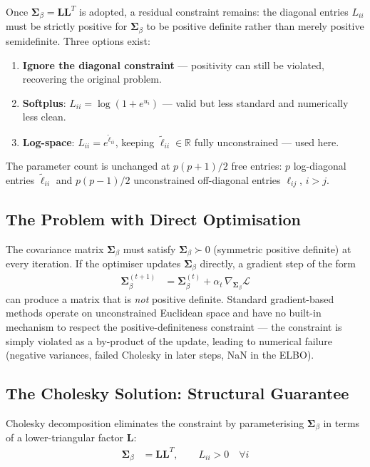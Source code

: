 \documentclass[11pt,a4paper]{article}
\newcommand{\R}{\mathbb{R}}
\begin{document}
Once $\bm{\Sigma}_\beta = \bm{L}\bm{L}^T$ is adopted, a residual constraint remains: the diagonal entries $L_{ii}$ must be strictly positive for $\bm{\Sigma}_\beta$ to be positive definite rather than merely positive semidefinite. Three options exist:
\begin{enumerate}
  \item \textbf{Ignore the diagonal constraint} --- positivity can still be violated, recovering the original problem.
  \item \textbf{Softplus}: $L_{ii} = \log(1 + e^{u_i})$ --- valid but less standard and numerically less clean.
  \item \textbf{Log-space}: $L_{ii} = e^{\tilde{\ell}_{ii}}$, keeping $\tilde{\ell}_{ii} \in \R$ fully unconstrained --- used here.
\end{enumerate}
The parameter count is unchanged at $p(p+1)/2$ free entries: $p$ log-diagonal entries $\tilde{\ell}_{ii}$ and $p(p-1)/2$ unconstrained off-diagonal entries $\ell_{ij}$, $i > j$.

\subsection*{The Problem with Direct Optimisation}

The covariance matrix $\bm{\Sigma}_\beta$ must satisfy $\bm{\Sigma}_\beta \succ 0$ (symmetric positive definite) at every iteration. If the optimiser updates $\bm{\Sigma}_\beta$ directly, a gradient step of the form
\begin{align}
  \bm{\Sigma}_\beta^{(t+1)} &= \bm{\Sigma}_\beta^{(t)} + \alpha_t \,\nabla_{\bm{\Sigma}_\beta}\mathcal{L}
\end{align}
can produce a matrix that is \emph{not} positive definite. Standard gradient-based methods operate on unconstrained Euclidean space and have no built-in mechanism to respect the positive-definiteness constraint --- the constraint is simply violated as a by-product of the update, leading to numerical failure (negative variances, failed Cholesky in later steps, NaN in the ELBO).

\subsection*{The Cholesky Solution: Structural Guarantee}

Cholesky decomposition eliminates the constraint by parameterising $\bm{\Sigma}_\beta$ in terms of a lower-triangular factor $\bm{L}$:
\begin{align}
  \bm{\Sigma}_\beta &= \bm{L}\bm{L}^T, \qquad L_{ii} > 0 \quad \forall i
\end{align}
\end{document}
